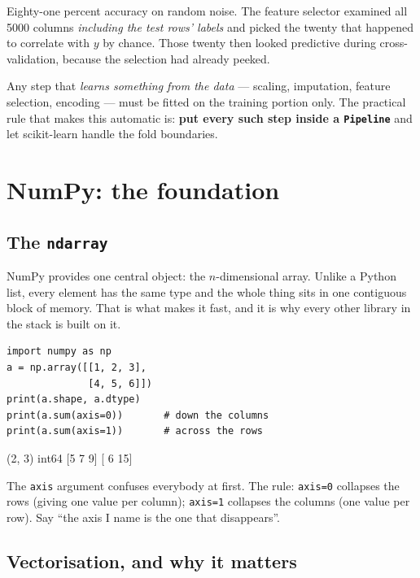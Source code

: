 \documentclass[11pt]{article}
\begin{document}
Eighty-one percent accuracy on random noise. The feature selector examined all
5000 columns \emph{including the test rows' labels} and picked the twenty that
happened to correlate with $y$ by chance. Those twenty then looked predictive
during cross-validation, because the selection had already peeked.

\begin{keyidea}
Any step that \emph{learns something from the data} --- scaling, imputation,
feature selection, encoding --- must be fitted on the training portion only. The
practical rule that makes this automatic is: \textbf{put every such step inside
a \texttt{Pipeline}} and let scikit-learn handle the fold boundaries.
\end{keyidea}

\newpage
\section{NumPy: the foundation}

\subsection{The \texttt{ndarray}}

NumPy provides one central object: the $n$-dimensional array. Unlike a Python
list, every element has the same type and the whole thing sits in one contiguous
block of memory. That is what makes it fast, and it is why every other library
in the stack is built on it.

\begin{lstlisting}
import numpy as np
a = np.array([[1, 2, 3],
              [4, 5, 6]])
print(a.shape, a.dtype)
print(a.sum(axis=0))       # down the columns
print(a.sum(axis=1))       # across the rows
\end{lstlisting}
\begin{codeout}
(2, 3) int64
[5 7 9]
[ 6 15]
\end{codeout}

The \texttt{axis} argument confuses everybody at first. The rule:
\texttt{axis=0} collapses the rows (giving one value per column);
\texttt{axis=1} collapses the columns (one value per row). Say ``the axis I name
is the one that disappears''.

\subsection{Vectorisation, and why it matters}
\end{document}
